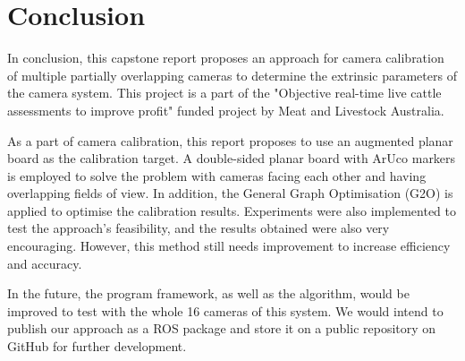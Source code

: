 \chapter{Conclusion}
In conclusion, this capstone report proposes an approach for camera calibration of multiple partially overlapping cameras to determine the extrinsic parameters of the camera system. This project is a part of the "Objective real-time live cattle assessments to improve profit" funded project by Meat and Livestock Australia.

As a part of camera calibration, this report proposes to use an augmented planar board as the calibration target. A double-sided planar board with ArUco markers is employed to solve the problem with cameras facing each other and having overlapping fields of view. In addition, the General Graph Optimisation (G2O) is applied to optimise the calibration results. Experiments were also implemented to test the approach's feasibility, and the results obtained were also very encouraging. However, this method still needs improvement to increase efficiency and accuracy.

In the future, the program framework, as well as the algorithm, would be improved to test with the whole 16 cameras of this system. We would intend to publish our approach as a ROS package and store it on a public repository on GitHub for further development. 

